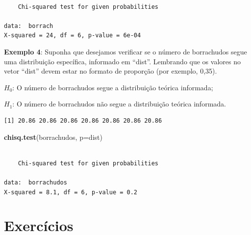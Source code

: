 \documentclass[12pt,brazil,oneside]{book}
\newenvironment{Shaded}{\begin{snugshade}}{\end{snugshade}}
\newcommand{\DataTypeTok}[1]{\textcolor[rgb]{0.13,0.29,0.53}{#1}}
\newcommand{\DecValTok}[1]{\textcolor[rgb]{0.00,0.00,0.81}{#1}}
\newcommand{\FloatTok}[1]{\textcolor[rgb]{0.00,0.00,0.81}{#1}}
\newcommand{\KeywordTok}[1]{\textcolor[rgb]{0.13,0.29,0.53}{\textbf{#1}}}
\newcommand{\NormalTok}[1]{#1}
\newcommand{\OperatorTok}[1]{\textcolor[rgb]{0.81,0.36,0.00}{\textbf{#1}}}
\begin{document}
\begin{verbatim}

    Chi-squared test for given probabilities

data:  borrach
X-squared = 24, df = 6, p-value = 6e-04
\end{verbatim}

\textbf{Exemplo 4}: Suponha que desejamos verificar se o número de borrachudos segue uma distribuição específica, informado em ``dist''. Lembrando que os valores no vetor ``dist'' devem estar no formato de proporção (por exemplo, 0,35).

\(H_0\): O número de borrachudos segue a distribuição teórica informada;

\(H_1\): O número de borrachudos não segue a distribuição teórica informada.

\begin{Shaded}
\end{Shaded}

\begin{verbatim}
[1] 20.86 20.86 20.86 20.86 20.86 20.86 20.86
\end{verbatim}

\begin{Shaded}
\begin{Highlighting}[]
\KeywordTok{chisq.test}\NormalTok{(borrachudos, }\DataTypeTok{p=}\NormalTok{dist)}
\end{Highlighting}
\end{Shaded}

\begin{verbatim}

    Chi-squared test for given probabilities

data:  borrachudos
X-squared = 8.1, df = 6, p-value = 0.2
\end{verbatim}

\hypertarget{exercicios-3}{%
\section{Exercícios}\label{exercicios-3}}
\end{document}
